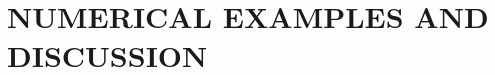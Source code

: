 \documentclass{article}
\begin{document}
%
%
%
%
%
%



\section{NUMERICAL EXAMPLES AND DISCUSSION}
\end{document}
